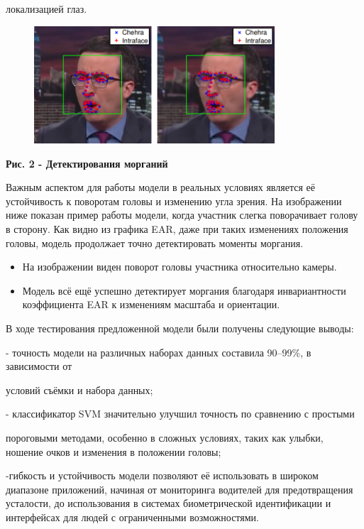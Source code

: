 локализацией глаз.

\begin{figure}[H]
	\centering
	\includegraphics[width=0.8\textwidth]{media/ict/image16}
	\caption*{}
\end{figure}


{\bfseries Рис. 2 - Детектирования морганий}

Важным аспектом для работы модели в реальных условиях является её
устойчивость к поворотам головы и изменению угла зрения. На изображении
ниже показан пример работы модели, когда участник слегка поворачивает
голову в сторону. Как видно из графика EAR, даже при таких изменениях
положения головы, модель продолжает точно детектировать моменты
моргания.

\begin{itemize}
\item
  На изображении виден поворот головы участника относительно камеры.
\item
  Модель всё ещё успешно детектирует моргания благодаря инвариантности
  коэффициента EAR к изменениям масштаба и ориентации.
\end{itemize}

В ходе тестирования предложенной модели были получены следующие выводы:

- точность модели на различных наборах данных составила 90--99\%, в
зависимости от

условий съёмки и набора данных;

- классификатор SVM значительно улучшил точность по сравнению с простыми

пороговыми методами, особенно в сложных условиях, таких как улыбки,
ношение очков и изменения в положении головы;

-гибкость и устойчивость модели позволяют её использовать в широком
диапазоне приложений, начиная от мониторинга водителей для
предотвращения усталости, до использования в системах биометрической
идентификации и интерфейсах для людей с ограниченными возможностями.

